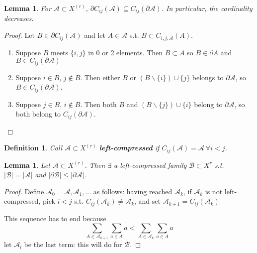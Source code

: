 \documentclass[a4paper]{article}
\newtheorem*{definition}{Definition}
\newtheorem{lemma}[theorem]{Lemma}
\newcommand*\abs[1]{\left|#1\right|}
\begin{document}
\begin{lemma}
	For $\mathcal{A} \subset X^{(r)}$, $\partial C_{ij}(\mathcal{A}) \subseteq C_{ij}(\partial \mathcal{A})$. In particular, the cardinality decreases.
\end{lemma}
\begin{proof}
	Let $B \in \partial C_{ij}(\mathcal{A})$ and let $A \in \mathcal{A}$ s.t. $B \subset C_{i,j,\mathcal{A}}(A)$.
	\begin{enumerate}[label=\roman*.]
		\item Suppose $B$ meets $\{i,j\}$ in 0 or 2 elements.
		Then $B \subset A$ so $B \in \partial A$ and $B \in C_{ij}(\partial \mathcal{A})$
		
		\item Suppose $i \in B$, $j \not\in B$.
		Then either $B$ or $(B \backslash \{i\}) \cup \{j\}$ belongs to $\partial \mathcal{A}$,
		so $B \in C_{ij}(\partial \mathcal{A})$.
		
		\item Suppose $j \in B$, $i \not\in B$.
		Then both $B$ and $(B \backslash \{j\}) \cup \{i\}$ belong to $\partial\mathcal{A}$,
		so both belong to $C_{ij}(\partial\mathcal{A})$.
	\end{enumerate}
\end{proof}
\begin{definition}
	Call $\mathcal{A} \subset X^{(r)}$ \textbf{left-compressed} if $C_{ij}(\mathcal{A}) = \mathcal{A}\ \forall i < j$.
\end{definition}

\begin{lemma}
	Let $\mathcal{A} \subset X^{(r)}$. Then $\exists$ a left-compressed family $\mathcal{B} \subset X^{r}$ s.t. $\abs{\mathcal{B}}=\abs{\mathcal{A}}$ and $\abs{\partial\mathcal{B}} \leq \abs{\partial\mathcal{A}}$.
\end{lemma}
\begin{proof}
	Define $\mathcal{A}_0 = \mathcal{A}, \mathcal{A}_1, \dots$ as follows:
	having reached $\mathcal{A}_k$,
	if $\mathcal{A}_k$ is not left-compressed,
	pick $i < j$ s.t. $C_{ij}(\mathcal{A}_k) \neq \mathcal{A}_k$,
	and set $\mathcal{A}_{k+1} = C_{ij}(\mathcal{A}_k)$
	
	This sequence has to end because $$\sum_{A \in \mathcal{A}_{k+1}} \sum_{a \in A} a < \sum_{A \in \mathcal{A}_{k}} \sum_{a \in A} a$$
	let $\mathcal{A}_l$ be the last term: this will do for $\mathcal{B}$.
\end{proof}
\end{document}
